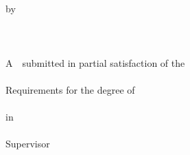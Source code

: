 {\begin{titlepage}
\begin{center}
  \qquad\\
  \qquad\\
  \begin{spacing}{2}
  \xiaosi
  by\\
  \@ename \\

  \qquad\\
  \@cbe\\
  A~\@cdegree~submitted in partial satisfaction of the\\

  \qquad\\
  Requirements for the degree of\\
  \@cclass\\

  \vspace{4\baselineskip}
  in\\
  \@ehnu\\
  Supervisor\\
  \@elevel~~ \@esupervisor\\
  \@edate
  \end{spacing}
\end{center}

\end{titlepage}

%

\clearpage
\thispagestyle{empty} %

}
